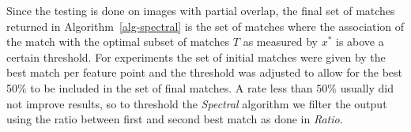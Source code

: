 Since the testing is done on images with partial overlap, the final set 
of matches returned in Algorithm~\ref{alg-spectral} is the set of 
matches where the association of the match with the optimal subset of 
matches $T$ as measured by $x^{*}$ is above a certain threshold. For 
experiments the set of initial matches were given by the best match per 
feature point and the threshold was adjusted to allow for the best 50\% 
to be included in the set of final matches. A rate less than 50\% 
usually did not improve results, so to threshold the \emph{Spectral}
algorithm we filter the output using the ratio between first and second
best match as done in \emph{Ratio}.
